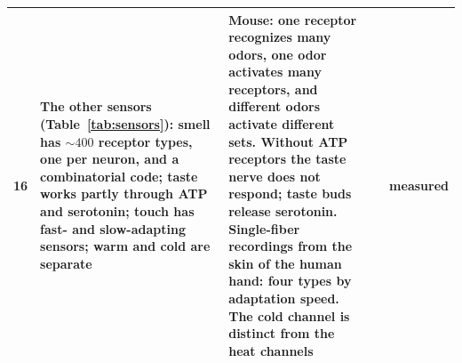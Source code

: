 {\begin{longtable}{>{\raggedright}p{0.5cm}>{\raggedright}p{4.0cm}>{\raggedright}p{5.6cm}>{\raggedright}p{2.3cm}>{\raggedright\arraybackslash}p{1.7cm}}
16 & The other sensors (Table~\ref{tab:sensors}): smell has $\sim400$ receptor types, one per neuron, and a combinatorial code; taste works partly through ATP and serotonin; touch has fast- and slow-adapting sensors; warm and cold are separate & Mouse: one receptor recognizes many odors, one odor activates many receptors, and different odors activate different sets. Without ATP receptors the taste nerve does not respond; taste buds release serotonin. Single-fiber recordings from the skin of the human hand: four types by adaptation speed. The cold channel is distinct from the heat channels & \cite{Mombaerts2004,Malnic1999,Finger2005,Huang2005,JohanssonVallbo1979,McKemy2002} & measured \\
\bottomrule
\end{longtable}}
